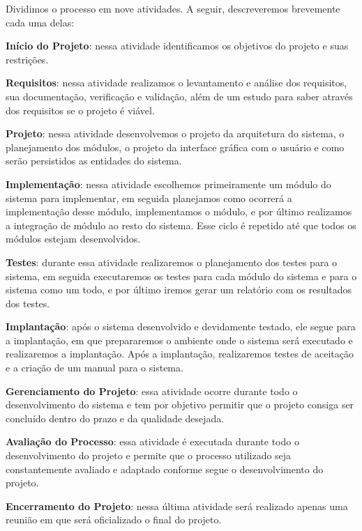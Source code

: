 Dividimos o processo em nove atividades. A seguir, descreveremos brevemente cada uma delas:
\begin{alineascomnumero}
	\item \textbf{In\'icio do Projeto}: nessa atividade identificamos os objetivos do projeto e suas restri\c{c}\~oes.
	\item \textbf{Requisitos}: nessa atividade realizamos o levantamento e an\'alise dos requisitos, sua documenta\c{c}\~ao, verifica\c{c}\~ao e valida\c{c}\~ao, al\'em de um estudo para saber 
atrav\'es dos 
requisitos se o projeto \'e vi\'avel. 
	\item \textbf{Projeto}: nessa atividade desenvolvemos o projeto da arquitetura do sistema, o planejamento dos m\'odulos, o projeto da interface gr\'afica com o usu\'ario  e como ser\~ao 
persistidos as 
entidades do sistema.
	\item \textbf{Implementação}: nessa atividade escolhemos primeiramente um m\'odulo do sistema para implementar, em seguida planejamos como ocorrer\'a a implementa\c{c}\~ao desse 
m\'odulo, implementamos o m\'odulo, e por \'ultimo realizamos a integra\c{c}\~ao de m\'odulo ao resto do sistema. Esse ciclo \'e repetido at\'e que todos os m\'odulos estejam desenvolvidos.
	\item \textbf{Testes}: durante essa atividade realizaremos o planejamento dos testes para o sistema, em seguida executaremos os testes para cada m\'odulo do sistema e para o sistema como um todo, 
e 
por \'ultimo iremos gerar um relat\'orio com os resultados dos testes.
	\item \textbf{Implantação}: ap\'os o sistema desenvolvido e devidamente testado, ele segue para a implanta\c{c}\~ao, em que prepararemos o ambiente onde o sistema ser\'a executado e realizaremos 
a 
implanta\c{c}\~ao. Ap\'os a implanta\c{c}\~ao, realizaremos testes de aceita\c{c}\~ao e a cria\c{c}\~ao de um manual para o sistema.
	\item \textbf{Gerenciamento do Projeto}: essa atividade ocorre durante todo o desenvolvimento do sistema e tem por objetivo permitir que o projeto consiga ser conclu\'ido dentro do prazo e da 
qualidade 
desejada.
	\item \textbf{Avalia\c{c}\~ao do Processo}: essa atividade \'e executada durante todo o desenvolvimento do projeto e permite que o processo utilizado seja constantemente avaliado e adaptado 
conforme segue 
o desenvolvimento do projeto.
	\item \textbf{Encerramento do Projeto}: nessa \'ultima atividade ser\'a realizado apenas uma reuni\~ao em que ser\'a oficializado o final do projeto.
\end{alineascomnumero}

